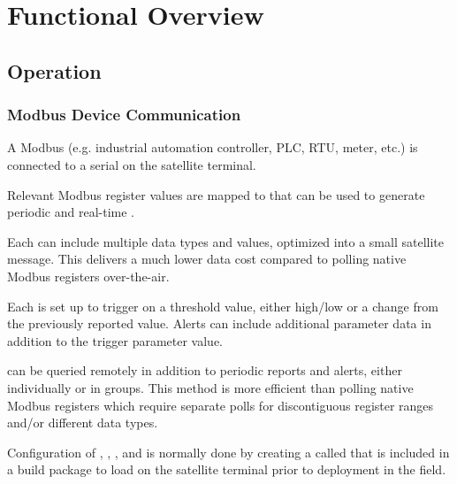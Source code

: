 \documentclass[letterpaper,10pt,english]{sphinxmanual}
\begin{document}
\section{Functional Overview}
\label{\detokenize{funcspec:functional-overview}}\label{\detokenize{funcspec::doc}}

\subsection{Operation}
\label{\detokenize{funcspec:operation}}

\subsubsection{Modbus Device Communication}
\label{\detokenize{funcspec:modbus-device-communication}}
A Modbus  (e.g. industrial automation controller, PLC, RTU, meter, etc.) is connected to a serial  on the satellite terminal.

Relevant Modbus register values are mapped to  that can be used to generate periodic  and real-time .

Each  can include multiple data types and values, optimized into a small satellite message.  This delivers a much lower data cost compared to polling native Modbus registers over-the-air.

Each  is set up to trigger on a  threshold value, either high/low or a change from the previously reported value.  Alerts can include additional parameter data in addition to the trigger parameter value.

 can be queried remotely in addition to periodic reports and alerts, either individually or in groups.  This method is more efficient than polling native Modbus registers which require separate polls for discontiguous register ranges and/or different data types.

Configuration of , , ,  and  is normally done by creating a  called  that is included in a build package to load on the satellite terminal prior to deployment in the field.
\end{document}
